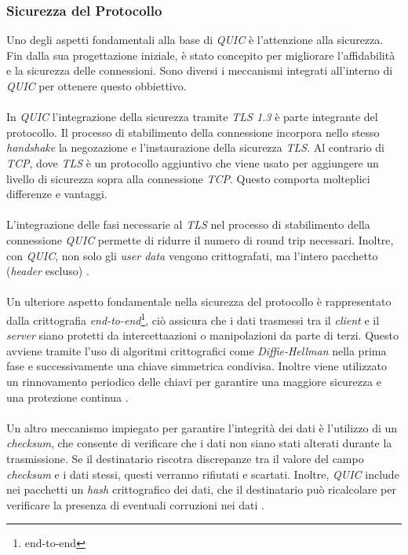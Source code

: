 \subsubsection{Sicurezza del Protocollo}
Uno degli aspetti fondamentali alla base di \emph{QUIC} è l'attenzione alla sicurezza. Fin dalla sua progettazione iniziale, è stato concepito per migliorare l'affidabilità e la sicurezza delle connessioni. 
Sono diversi i meccanismi integrati all'interno di \emph{QUIC} per ottenere questo obbiettivo.
\\\\
In \emph{QUIC} l'integrazione della sicurezza tramite \emph{TLS 1.3} è parte integrante del protocollo. Il processo di stabilimento della connessione incorpora nello stesso \emph{handshake} la negozazione e l'instaurazione della sicurezza \emph{TLS}. 
Al contrario di \emph{TCP}, dove \emph{TLS} è un protocollo aggiuntivo che viene usato per aggiungere un livello di sicurezza sopra alla connessione \emph{TCP}. Questo comporta molteplici differenze e vantaggi.
\\\\
L'integrazione delle fasi necessarie al \emph{TLS} nel processo di stabilimento della connessione \emph{QUIC} permette di ridurre il numero di round trip necessari.
Inoltre, con \emph{QUIC}, non solo gli \emph{user data} vengono crittografati, ma l'intero pacchetto (\emph{header} escluso) \cite{site:Explaining-QUIC}.
\\\\
Un ulteriore aspetto fondamentale nella sicurezza del protocollo è rappresentato dalla crittografia \emph{end-to-end}\footnote{\gls{end-to-end}}, ciò assicura che i dati trasmessi tra il \emph{client} e il \emph{server} siano protetti da intercettaazioni o manipolazioni da parte di terzi.
Questo avviene tramite l'uso di algoritmi crittografici come \emph{Diffie-Hellman} nella prima fase e successivamente una chiave simmetrica condivisa. Inoltre viene utilizzato un rinnovamento periodico delle chiavi per garantire una maggiore sicurezza e una protezione continua \cite{site:quic-security}.
\\\\
Un altro meccanismo impiegato per garantire l'integrità dei dati è l'utilizzo di un \emph{checksum}, che consente di verificare che i dati non siano stati alterati durante la trasmissione.
Se il destinatario riscotra discrepanze tra il valore del campo \emph{checksum} e i dati stessi, questi verranno rifiutati e scartati.
Inoltre, \emph{QUIC} include nei pacchetti un \emph{hash} crittografico dei dati, che il destinatario può ricalcolare per verificare la presenza di eventuali corruzioni nei dati \cite{site:quic-security}.
